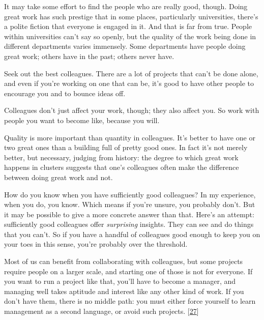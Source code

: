 It
                  may take some effort to find the people who are really good,
                  though. Doing great work has such prestige that in some
                  places, particularly universities, there's a polite fiction
                  that everyone is engaged in it. And that is far from true.
                  People within universities can't say so openly, but the
                  quality of the work being done in different departments varies
                  immensely. Some departments have people doing great work;
                  others have in the past; others never have.






                  Seek out the best colleagues. There are a lot of projects that
                  can't be done alone, and even if you're working on one that
                  can be, it's good to have other people to encourage you and to
                  bounce ideas off.

Colleagues don't just affect your
                  work, though; they also affect you. So work with people you
                  want to become like, because you will.

Quality is
                  more important than quantity in colleagues. It's better to
                  have one or two great ones than a building full of pretty good
                  ones. In fact it's not merely better, but necessary, judging
                  from history: the degree to which great work happens in
                  clusters suggests that one's colleagues often make the
                  difference between doing great work and not.

How do
                  you know when you have sufficiently good colleagues? In my
                  experience, when you do, you know. Which means if you're
                  unsure, you probably don't. But it may be possible to give a
                  more concrete answer than that. Here's an attempt:
                  sufficiently good colleagues offer \emph{surprising} insights.
                  They can see and do things that you can't. So if you have a
                  handful of colleagues good enough to keep you on your toes in
                  this sense, you're probably over the threshold.

Most
                  of us can benefit from collaborating with colleagues, but some
                  projects require people on a larger scale, and starting one of
                  those is not for everyone. If you want to run a project like
                  that, you'll have to become a manager, and managing well takes
                  aptitude and interest like any other kind of work. If you
                  don't have them, there is no middle path: you must either
                  force yourself to learn management as a second language, or
                  avoid such projects.
                  [\href{\#f27n}{27}]






